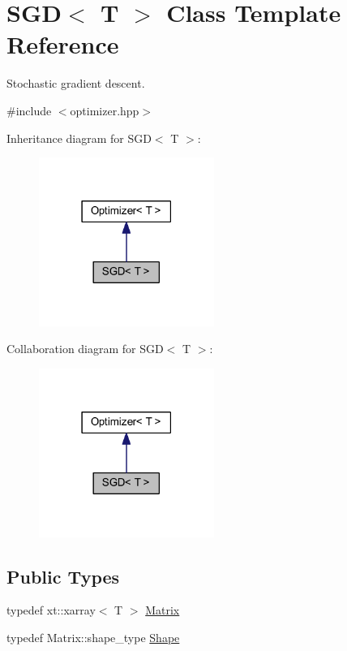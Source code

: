 \hypertarget{class_s_g_d}{}\section{S\+GD$<$ T $>$ Class Template Reference}
\label{class_s_g_d}


Stochastic gradient descent.  




{\ttfamily \#include $<$optimizer.\+hpp$>$}



Inheritance diagram for S\+GD$<$ T $>$\+:
\nopagebreak
\begin{figure}[H]
\begin{center}
\leavevmode
\includegraphics[width=162pt]{class_s_g_d__inherit__graph}
\end{center}
\end{figure}


Collaboration diagram for S\+GD$<$ T $>$\+:
\nopagebreak
\begin{figure}[H]
\begin{center}
\leavevmode
\includegraphics[width=162pt]{class_s_g_d__coll__graph}
\end{center}
\end{figure}
\subsection*{Public Types}
\begin{DoxyCompactItemize}
\item 
typedef xt\+::xarray$<$ T $>$ \mbox{\hyperlink{class_s_g_d_a0c157dbad2dc900c00b9ca57f23ba676}{Matrix}}
\item 
typedef Matrix\+::shape\+\_\+type \mbox{\hyperlink{class_s_g_d_a3275687cc77c8557e2198c1feaed28a4}{Shape}}
\end{DoxyCompactItemize}
